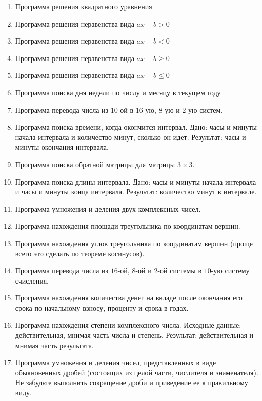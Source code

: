 \begin{enumerate}
 \item Программа решения квадратного уравнения
 \item Программа решения неравенства вида $ax+b>0$
    \item Программа решения неравенства вида $ax+b<0$
 \item Программа решения неравенства вида $ax+b\geqslant 0$
 \item Программа решения неравенства вида $ax+b\leqslant 0$
\item Программа поиска дня недели по числу и месяцу в текущем году
 \item  Программа перевода числа из $10$-ой в $16$-ую, $8$-ую и $2$-ую систем.
 \item  Программа поиска времени, когда окончится интервал. 
 Дано: часы и минуты начала интервала и количество минут, сколько он идет.
 Результат: часы и минуты окончания интервала.
  \item Программа поиска обратной матрицы для матрицы $3\times3$.
 \item
 Программа поиска длины интервала. 
 Дано: часы и минуты начала интервала и часы и минуты конца интервала.
 Результат: количество минут в интервале.
 \item
 Программа умножения и деления двух комплексных чисел.
 
 
 \item
 Программа нахождения площади треугольника по координатам вершин.
 
 \item
 Программа нахождения углов треугольника по координатам вершин (проще всего это сделать по теореме косинусов).

  
 \item
 Программа перевода числа из $16$-ой, $8$-ой и $2$-ой системы в $10$-ую систему счисления.
 
 
 \item
 Программа нахождения количества денег на вкладе после окончания его срока по начальному взносу, проценту и срока в годах.
 
 
 \item
 Программа нахождения степени комплексного числа. Исходные данные: действительная, мнимая часть числа и степень. 
 Результат: действительная и мнимая часть результата.
 
 
 \item
 Программа умножения и деления чисел, представленных в виде обыкновенных дробей (состоящих из целой части, числителя и 
 знаменателя). Не забудьте выполнить сокращение дроби и приведение ее к правильному виду.


\end{enumerate}
